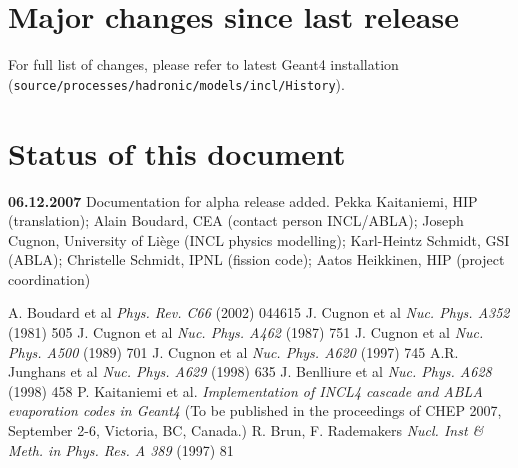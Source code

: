 \section{Major changes since last release}



For full list of changes, please refer to latest Geant4 installation
({\tt source\-/processes\-/hadronic\-/models\-/incl\-/History}).

\section{Status of this document}

{\bf 06.12.2007} Documentation for alpha release added. Pekka
Kaitaniemi, HIP (translation); Alain Boudard, CEA (contact person
INCL/ABLA); Joseph Cugnon, University of Li\`ege (INCL physics
modelling); Karl-Heintz Schmidt, GSI (ABLA); Christelle Schmidt, IPNL
(fission code); Aatos Heikkinen, HIP (project coordination)


\begin{thebibliography}{99}



 A. Boudard et al \emph{Phys. Rev. C66} (2002) 044615
 J. Cugnon et al \emph{Nuc. Phys. A352} (1981) 505
 J. Cugnon et al \emph{Nuc. Phys. A462} (1987) 751
 J. Cugnon et al \emph{Nuc. Phys. A500} (1989) 701
 J. Cugnon et al \emph{Nuc. Phys. A620} (1997) 745
 A.R. Junghans et al \emph{Nuc. Phys. A629} (1998) 635
 J. Benlliure et al \emph{Nuc. Phys. A628} (1998) 458
 P. Kaitaniemi et al. \emph{Implementation of
    INCL4 cascade and ABLA evaporation codes in Geant4} (To be
    published in the proceedings of CHEP 2007, September 2-6,
    Victoria, BC, Canada.)
 R. Brun, F. Rademakers \emph{Nucl. Inst \&
    Meth. in Phys. Res. A 389} (1997) 81
\end{thebibliography}